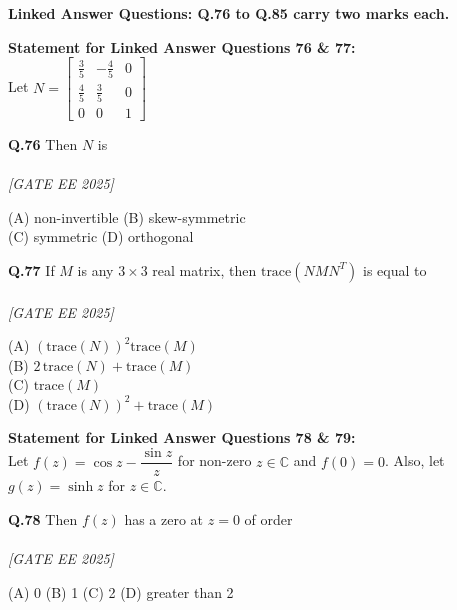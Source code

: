 \documentclass[11pt]{article}
\begin{document}
\bigskip

\noindent\textbf{Linked Answer Questions: Q.76 to Q.85 carry two marks each.}

\bigskip

\noindent\textbf{Statement for Linked Answer Questions 76 \& 77:} \\
Let $N = \begin{bmatrix} \frac{3}{5} & -\frac{4}{5} & 0 \\ \frac{4}{5} & \frac{3}{5} & 0 \\ 0 & 0 & 1 \end{bmatrix}$

\begin{flushleft}
\textbf{Q.76} Then $N$ is \\
\\[1ex] \textit{[GATE EE 2025]}

(A) non-invertible \hspace{2em}
(B) skew-symmetric \\
(C) symmetric \hspace{2em}
(D) orthogonal
\end{flushleft}

\begin{flushleft}
\textbf{Q.77} If $M$ is any $3 \times 3$ real matrix, then $\text{trace}(NMN^T)$ is equal to \\
\\[1ex] \textit{[GATE EE 2025]}

(A) $\left( \text{trace}(N) \right)^2 \text{trace}(M)$ \\
(B) $2\, \text{trace}(N) + \text{trace}(M)$ \\
(C) $\text{trace}(M)$ \\
(D) $\left( \text{trace}(N) \right)^2 + \text{trace}(M)$
\end{flushleft}

\bigskip

\noindent\textbf{Statement for Linked Answer Questions 78 \& 79:} \\
Let $f(z) = \cos z - \dfrac{\sin z}{z}$ for non-zero $z \in \mathbb{C}$ and $f(0) = 0$. Also, let $g(z) = \sinh z$ for $z \in \mathbb{C}$.

\begin{flushleft}
\textbf{Q.78} Then $f(z)$ has a zero at $z = 0$ of order \\
\\[1ex] \textit{[GATE EE 2025]}

(A) 0 \hspace{2em} (B) 1 \hspace{2em} (C) 2 \hspace{2em} (D) greater than 2
\end{flushleft}
\end{document}
